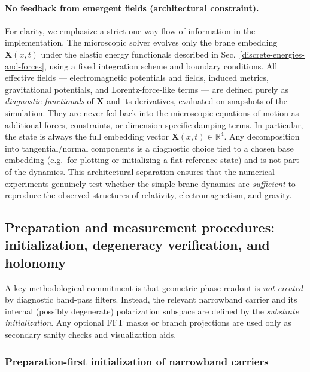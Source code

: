 \paragraph{No feedback from emergent fields (architectural constraint).}
For clarity, we emphasize a strict one-way flow of information in the
implementation. The microscopic solver evolves only the brane embedding
$\mathbf{X}(x,t)$ under the elastic energy functionals described in
Sec.~\ref{discrete-energies-and-forces}, using a fixed integration scheme and
boundary conditions. All effective fields --- electromagnetic
potentials and fields, induced metrics, gravitational potentials, and
Lorentz-force-like terms --- are defined purely as \emph{diagnostic
functionals} of $\mathbf{X}$ and its derivatives, evaluated on
snapshots of the simulation. They are never fed back into the
microscopic equations of motion as additional forces, constraints, or
dimension-specific damping terms. In particular, the state is always the full embedding vector $\mathbf{X}(x,t)\in\mathbb{R}^4$. Any decomposition into tangential/normal components is a diagnostic choice tied to a chosen base embedding (e.g.\ for plotting or initializing a flat reference state) and is not part of the dynamics. This architectural separation ensures that the numerical
experiments genuinely test whether the simple brane dynamics are
\emph{sufficient} to reproduce the observed structures of relativity,
electromagnetism, and gravity.

\subsection{Preparation and measurement procedures: initialization, degeneracy verification, and holonomy}
\label{measurement-procedures}

A key methodological commitment is that geometric phase readout is \emph{not created}
by diagnostic band-pass filters. Instead, the relevant narrowband carrier and its
internal (possibly degenerate) polarization subspace are defined by the
\emph{substrate initialization}. Any optional FFT masks or branch projections are used
only as secondary sanity checks and visualization aids.

\subsubsection{Preparation-first initialization of narrowband carriers}
\label{sec:init-carriers}

